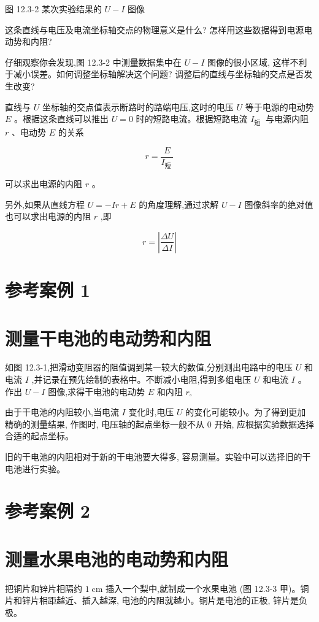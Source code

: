 \documentclass[10pt]{article}
\begin{document}
图 12.3-2 某次实验结果的 \(U - I\) 图像

这条直线与电压及电流坐标轴交点的物理意义是什么? 怎样用这些数据得到电源电动势和内阻?

仔细观察你会发现,图 12.3-2 中测量数据集中在 \(U - I\) 图像的很小区域, 这样不利于减小误差。如何调整坐标轴解决这个问题? 调整后的直线与坐标轴的交点是否发生改变?

直线与 \(U\) 坐标轴的交点值表示断路时的路端电压,这时的电压 \(U\) 等于电源的电动势 \(E\) 。根据这条直线可以推出 \(U = 0\) 时的短路电流。根据短路电流 \({I}_{\text{短 }}\) 与电源内阻 \(r\) 、电动势 \(E\) 的关系

\[
r = \frac{E}{{I}_{\text{短 }}}
\]

可以求出电源的内阻 \(r\) 。

另外,如果从直线方程 \(U = - {Ir} + E\) 的角度理解,通过求解 \(U - I\) 图像斜率的绝对值也可以求出电源的内阻 \(r\) ,即

\[
r = \left| \frac{\Delta U}{\Delta I}\right|
\]

\section*{参考案例 1}

\section*{测量干电池的电动势和内阻}

如图 12.3-1,把滑动变阻器的阻值调到某一较大的数值,分别测出电路中的电压 \(U\) 和电流 \(I\) ,并记录在预先绘制的表格中。不断减小电阻,得到多组电压 \(U\) 和电流 \(I\) 。 作出 \(U - I\) 图像,求得干电池的电动势 \(E\) 和内阻 \({r}_{ \circ }\)

由于干电池的内阻较小,当电流 \(I\) 变化时,电压 \(U\) 的变化可能较小。为了得到更加精确的测量结果, 作图时, 电压轴的起点坐标一般不从 0 开始, 应根据实验数据选择合适的起点坐标。

旧的干电池的内阻相对于新的干电池要大得多, 容易测量。实验中可以选择旧的干电池进行实验。

\section*{参考案例 2}

\section*{测量水果电池的电动势和内阻}

把铜片和锌片相隔约 \(1\mathrm{\;{cm}}\) 插入一个梨中,就制成一个水果电池 (图 12.3-3 甲)。铜片和锌片相距越近、插入越深, 电池的内阻就越小。铜片是电池的正极, 锌片是负极。
\end{document}
